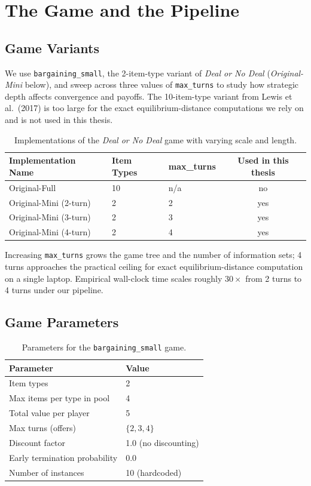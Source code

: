\documentclass[11pt]{article}
\begin{document}
\section{The Game and the Pipeline}
\label{sec:dond_game}

\subsection{Game Variants}

We use \texttt{bargaining\_small}, the 2-item-type variant of \emph{Deal or No Deal} (\emph{Original-Mini} below), and sweep across three values of \texttt{max\_turns} to study how strategic depth affects convergence and payoffs. The 10-item-type variant from Lewis et al.\ (2017) is too large for the exact equilibrium-distance computations we rely on and is not used in this thesis.

\begin{table}[H]
\centering
\begin{tabular}{@{}lllc@{}}
\toprule
\textbf{Implementation Name} & \textbf{Item Types} & \textbf{max\_turns} & \textbf{Used in this thesis}\\
\midrule
Original-Full   & 10 & n/a & no \\
Original-Mini (2-turn)   & 2 & 2 & yes \\
Original-Mini (3-turn)   & 2 & 3 & yes \\
Original-Mini (4-turn)   & 2 & 4 & yes \\
\bottomrule
\end{tabular}
\caption{Implementations of the \emph{Deal or No Deal} game with varying scale and length.}
\label{tab:game_variants}
\end{table}

Increasing \texttt{max\_turns} grows the game tree and the number of information sets; 4 turns approaches the practical ceiling for exact equilibrium-distance computation on a single laptop. Empirical wall-clock time scales roughly $30\times$ from 2 turns to 4 turns under our pipeline.

\subsection{Game Parameters}

\begin{table}[H]
\centering
\begin{tabular}{@{}ll@{}}
\toprule
\textbf{Parameter} & \textbf{Value} \\
\midrule
Item types & 2 \\
Max items per type in pool & 4 \\
Total value per player & 5 \\
Max turns (offers) & $\{2, 3, 4\}$ \\
Discount factor & 1.0 (no discounting) \\
Early termination probability & 0.0 \\
Number of instances & 10 (hardcoded) \\
\bottomrule
\end{tabular}
\caption{Parameters for the \texttt{bargaining\_small} game.}
\label{tab:params}
\end{table}
\end{document}
